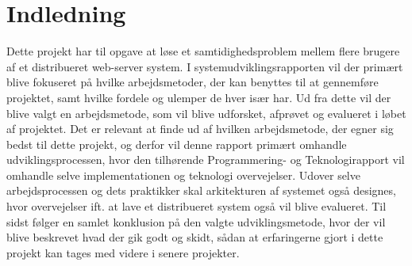 \chapter{Indledning}\label{ch:indledning}
Dette projekt har til opgave at løse et samtidighedsproblem mellem flere brugere af et distribueret web-server system. I systemudviklingsrapporten vil der primært blive fokuseret på hvilke arbejdsmetoder, der kan benyttes til at gennemføre projektet, samt hvilke fordele og ulemper de hver især har. Ud fra dette vil der blive valgt en arbejdsmetode, som vil blive udforsket, afprøvet og evalueret i løbet af projektet. Det er relevant at finde ud af hvilken arbejdsmetode, der egner sig bedst til dette projekt, og derfor vil denne rapport primært omhandle udviklingsprocessen, hvor den tilhørende Programmering- og Teknologirapport vil omhandle selve implementationen og teknologi overvejelser. Udover selve arbejdsprocessen og dets praktikker skal arkitekturen af systemet også designes, hvor overvejelser ift. at lave et distribueret system også vil blive evalueret. Til sidst følger en samlet konklusion på den valgte udviklingsmetode, hvor der vil blive beskrevet hvad der gik godt og skidt, sådan at erfaringerne gjort i dette projekt kan tages med videre i senere projekter.
